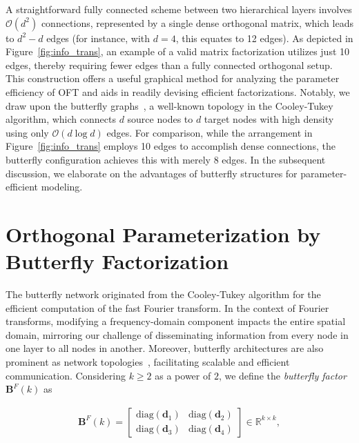 A straightforward fully connected scheme between two hierarchical layers involves $\mathcal{O}(d^2)$ connections, represented by a single dense orthogonal matrix, which leads to $d^2 - d$ edges (for instance, with $d=4$, this equates to 12 edges). As depicted in Figure~\ref{fig:info_trans}, an example of a valid matrix factorization utilizes just 10 edges, thereby requiring fewer edges than a fully connected orthogonal setup. This construction offers a useful graphical method for analyzing the parameter efficiency of OFT and aids in readily devising efficient factorizations. Notably, we draw upon the butterfly graphs~\cite{cooley1965algorithm}, a well-known topology in the Cooley-Tukey algorithm, which connects $d$ source nodes to $d$ target nodes with high density using only $\mathcal{O}(d\log d)$ edges. For comparison, while the arrangement in Figure~\ref{fig:info_trans} employs 10 edges to accomplish dense connections, the butterfly configuration achieves this with merely 8 edges. In the subsequent discussion, we elaborate on the advantages of butterfly structures for parameter-efficient modeling.

\section{Orthogonal Parameterization by Butterfly Factorization}

The butterfly network originated from the Cooley-Tukey algorithm for the efficient computation of the fast Fourier transform. In the context of Fourier transforms, modifying a frequency-domain component impacts the entire spatial domain, mirroring our challenge of disseminating information from every node in one layer to all nodes in another. Moreover, butterfly architectures are also prominent as network topologies~\cite{solihin2015fundamentals,li2011linear}, facilitating scalable and efficient communication. Considering $k\geq 2$ as a power of $2$, we define the \emph{butterfly factor} $\bm{B}^F(k)$ as

\begin{equation}\label{eq:but_factor}
\begin{aligned}
    \bm{B}^F(k)=\begin{bmatrix}
    \text{diag}(\bm{d}_1) & \text{diag}(\bm{d}_2) \\
    \text{diag}(\bm{d}_3) & \text{diag}(\bm{d}_4)
    \end{bmatrix}\in\mathbb{R}^{k\times k},
\end{aligned}
\end{equation}

